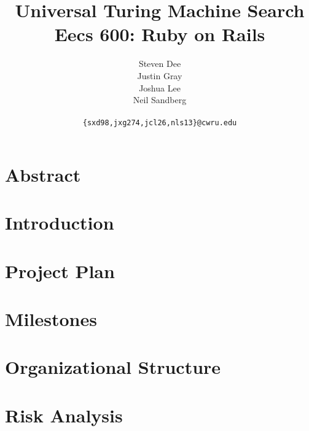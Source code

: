\documentclass{article}
\title{Universal Turing Machine Search\\
\Large {\sc Eecs} 600: Ruby on Rails}
\author{Steven Dee \\
Justin Gray \\
Joshua Lee \\
Neil Sandberg \\
 \\
\tt \{sxd98,jxg274,jcl26,nls13\}@cwru.edu}
\begin{document}
\maketitle

\section{Abstract}



\section{Introduction}



\section{Project Plan}



\section{Milestones}



\section{Organizational Structure}



\section{Risk Analysis}





\end{document}

